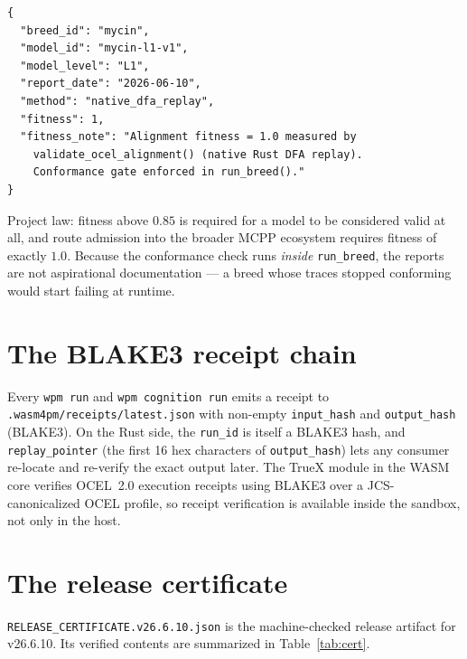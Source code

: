 \documentclass[11pt,oneside]{report}
\newcommand{\projver}{v26.6.10}
\begin{document}
\begin{lstlisting}[language={}]
{
  "breed_id": "mycin",
  "model_id": "mycin-l1-v1",
  "model_level": "L1",
  "report_date": "2026-06-10",
  "method": "native_dfa_replay",
  "fitness": 1,
  "fitness_note": "Alignment fitness = 1.0 measured by
    validate_ocel_alignment() (native Rust DFA replay).
    Conformance gate enforced in run_breed()."
}
\end{lstlisting}

Project law: fitness above $0.85$ is required for a model to be considered
valid at all, and route admission into the broader MCPP ecosystem requires
fitness of exactly $1.0$. Because the conformance check runs \emph{inside}
\texttt{run\_breed}, the reports are not aspirational documentation --- a
breed whose traces stopped conforming would start failing at runtime.

\section{The BLAKE3 receipt chain}

Every \texttt{wpm run} and \texttt{wpm cognition run} emits a receipt to
\texttt{.wasm4pm/receipts/latest.json} with non-empty \texttt{input\_hash}
and \texttt{output\_hash} (BLAKE3). On the Rust side, the
\texttt{run\_id} is itself a BLAKE3 hash, and \texttt{replay\_pointer} (the
first 16 hex characters of \texttt{output\_hash}) lets any consumer
re-locate and re-verify the exact output later. The TrueX module in the
WASM core verifies OCEL~2.0 execution receipts using BLAKE3 over a
JCS-canonicalized OCEL profile, so receipt verification is available inside
the sandbox, not only in the host.

\section{The release certificate}

\texttt{RELEASE\_CERTIFICATE.v26.6.10.json} is the machine-checked release
artifact for \projver{}. Its verified contents are summarized in
Table~\ref{tab:cert}.
\end{document}
